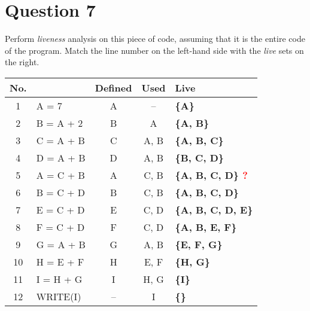 \documentclass{article}
\newcommand{\textr}[1]{\textcolor{red}{#1}}
\begin{document}
\section*{Question 7}
Perform \textit{liveness} analysis on this piece of code, assuming that it is the entire code of the program. Match the line number on the left-hand side with the \textit{live} sets on the right. \\
\begin{tabular}{|c|l|c|c|>{\bfseries}l|}
  \hline
  \textbf{No.} &  & \textbf{Defined} & \textbf{Used} & \textbf{Live} \\
  \hline
  1   & A = 7      & A  & --    & \{A\} \\
  \hline
  2   & B = A + 2  & B  & A     & \{A, B\} \\
  \hline
  3   & C = A + B  & C  & A, B  & \{A, B, C\} \\
  \hline
  4   & D = A + B  & D  & A, B  & \{B, C, D\} \\
  \hline
  5   & A = C + B  & A  & C, B  & \{A, B, C, D\} \textr{?} \\
  \hline
  6   & B = C + D  & B  & C, B  & \{A, B, C, D\} \\
  \hline
  7   & E = C + D  & E  & C, D  & \{A, B, C, D, E\} \\
  \hline
  8   & F = C + D  & F  & C, D  & \{A, B, E, F\} \\
  \hline
  9   & G = A + B  & G  & A, B  & \{E, F, G\} \\
  \hline
  10  & H = E + F  & H  & E, F  & \{H, G\} \\
  \hline
  11  & I = H + G  & I  & H, G  & \{I\} \\
  \hline
  12  & WRITE(I)   & -- & I     & \{\} \\
  \hline
\end{tabular}


\newpage
\end{document}
